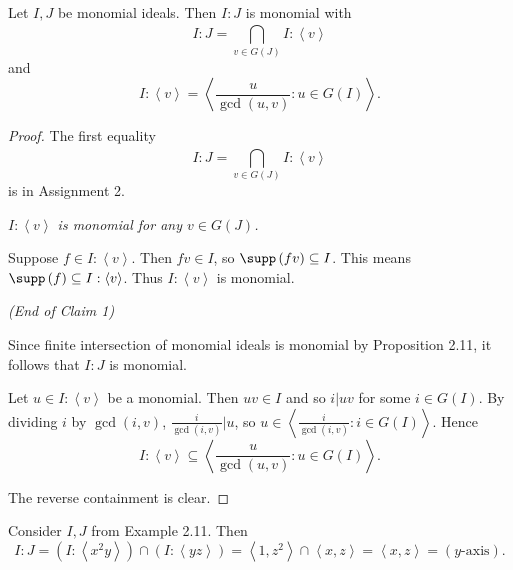 \documentclass[co439]{subfiles}
\begin{document}
    \begin{prop}{}
        Let $I,J$ be monomial ideals. Then $I:J$ is monomial with
        \begin{equation*}
            I:J = \bigcap^{}_{v\in G\left( J \right)} I:\left< v \right>
        \end{equation*}
        and
        \begin{equation*}
            I:\left< v \right> = \left< \frac{u}{\gcd\left( u,v \right)}: u\in G\left( I \right) \right>.  
        \end{equation*}
    \end{prop}

    \begin{proof}
        The first equality
        \begin{equation*}
            I:J = \bigcap^{}_{v\in G\left( J \right)} I:\left< v \right>
        \end{equation*}
        is in Assignment 2. 

        \begin{claim}
            \textit{$I:\left< v \right>$ is monomial for any $v\in G\left( J \right)$.}

            Suppose $f\in I:\left< v \right>$. Then $fv\in I$, so $\supp\left( fv \right)\subseteq I$. This means $\supp\left( f \right)\subseteq I:\left< v \right>$. Thus $I:\left< v \right>$ is monomial. 

            \hfill\textit{(End of Claim 1)}
        \end{claim}

        Since finite intersection of monomial ideals is monomial by Proposition 2.11, it follows that $I:J$ is monomial.
    
        Let $u\in I:\left< v \right>$ be a monomial. Then $uv\in I$ and so $i|uv$ for some $i\in G\left( I \right)$. By dividing $i$ by $\gcd\left( i,v \right)$, $\frac{i}{\gcd\left( i,v \right)}|u$, so $u\in \left< \frac{i}{\gcd\left( i,v \right)} : i\in G\left( I \right) \right>$. Hence
        \begin{equation*}
            I:\left< v \right> \subseteq \left< \frac{u}{\gcd\left( u,v \right)}:u\in G\left( I \right) \right>.  
        \end{equation*}

        The reverse containment is clear.
    \end{proof}

    \clearpage
    
    \begin{example}{}
        Consider $I,J$ from Example 2.11. Then
        \begin{equation*}
            I:J = \left( I:\left< x^{2}y \right>  \right)\cap\left( I:\left< yz \right>  \right) = \left< 1,z^{2} \right>\cap\left< x,z \right> = \left< x,z \right> = \left( \text{$y$-axis} \right).
        \end{equation*}
    \end{example}
\end{document}
